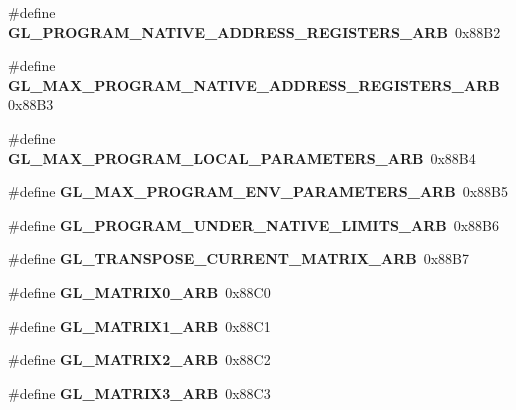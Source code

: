 \begin{DoxyCompactItemize}
\item 
\#define {\bfseries G\+L\+\_\+\+P\+R\+O\+G\+R\+A\+M\+\_\+\+N\+A\+T\+I\+V\+E\+\_\+\+A\+D\+D\+R\+E\+S\+S\+\_\+\+R\+E\+G\+I\+S\+T\+E\+R\+S\+\_\+\+A\+R\+B}~0x88\+B2\label{_s_d_l__opengl_8h_a09156f5f0992a29addbf9eaeb8f746cf}

\item 
\#define {\bfseries G\+L\+\_\+\+M\+A\+X\+\_\+\+P\+R\+O\+G\+R\+A\+M\+\_\+\+N\+A\+T\+I\+V\+E\+\_\+\+A\+D\+D\+R\+E\+S\+S\+\_\+\+R\+E\+G\+I\+S\+T\+E\+R\+S\+\_\+\+A\+R\+B}~0x88\+B3\label{_s_d_l__opengl_8h_a5189a1315fb905f710d9aa0d44e73614}

\item 
\#define {\bfseries G\+L\+\_\+\+M\+A\+X\+\_\+\+P\+R\+O\+G\+R\+A\+M\+\_\+\+L\+O\+C\+A\+L\+\_\+\+P\+A\+R\+A\+M\+E\+T\+E\+R\+S\+\_\+\+A\+R\+B}~0x88\+B4\label{_s_d_l__opengl_8h_a61def4e10e64fdfb0d961529f2d29b1c}

\item 
\#define {\bfseries G\+L\+\_\+\+M\+A\+X\+\_\+\+P\+R\+O\+G\+R\+A\+M\+\_\+\+E\+N\+V\+\_\+\+P\+A\+R\+A\+M\+E\+T\+E\+R\+S\+\_\+\+A\+R\+B}~0x88\+B5\label{_s_d_l__opengl_8h_a554358da18b1964567c87d950de35c83}

\item 
\#define {\bfseries G\+L\+\_\+\+P\+R\+O\+G\+R\+A\+M\+\_\+\+U\+N\+D\+E\+R\+\_\+\+N\+A\+T\+I\+V\+E\+\_\+\+L\+I\+M\+I\+T\+S\+\_\+\+A\+R\+B}~0x88\+B6\label{_s_d_l__opengl_8h_adfb36766165a8a1742de7323e943d8f7}

\item 
\#define {\bfseries G\+L\+\_\+\+T\+R\+A\+N\+S\+P\+O\+S\+E\+\_\+\+C\+U\+R\+R\+E\+N\+T\+\_\+\+M\+A\+T\+R\+I\+X\+\_\+\+A\+R\+B}~0x88\+B7\label{_s_d_l__opengl_8h_a61621409aa3bdd74b143465ed45795db}

\item 
\#define {\bfseries G\+L\+\_\+\+M\+A\+T\+R\+I\+X0\+\_\+\+A\+R\+B}~0x88\+C0\label{_s_d_l__opengl_8h_a6e2e6d77baeb09b9e8bdaa8c6b15b35c}

\item 
\#define {\bfseries G\+L\+\_\+\+M\+A\+T\+R\+I\+X1\+\_\+\+A\+R\+B}~0x88\+C1\label{_s_d_l__opengl_8h_a8ccabb21ca243d3743f10e55b0153aff}

\item 
\#define {\bfseries G\+L\+\_\+\+M\+A\+T\+R\+I\+X2\+\_\+\+A\+R\+B}~0x88\+C2\label{_s_d_l__opengl_8h_aa8cf2da9ddab14be483fe7084b6c3b48}

\item 
\#define {\bfseries G\+L\+\_\+\+M\+A\+T\+R\+I\+X3\+\_\+\+A\+R\+B}~0x88\+C3\label{_s_d_l__opengl_8h_a760b46981594cc2396f6a822326cf412}


\end{DoxyCompactItemize}
